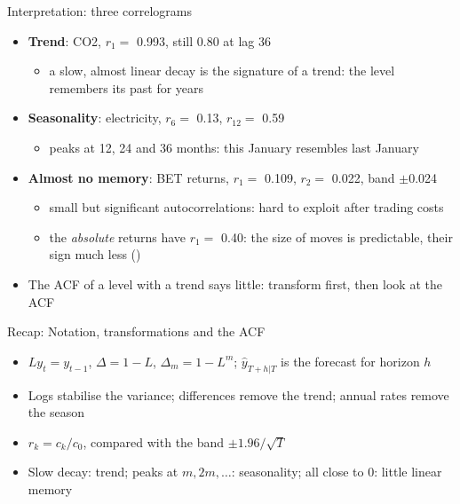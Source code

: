 \begin{frame}{Interpretation: three correlograms}
\itemsize{\small}
\begin{itemize}
    \item \textbf{Trend}: CO2, $r_1 = $ 0.993, still 0.80 at lag 36
    \begin{itemize}
        \item a slow, almost linear decay is the signature of a trend: the level remembers its past for years
    \end{itemize}
    \item \textbf{Seasonality}: electricity, $r_6 = $ 0.13, $r_{12} = $ 0.59
    \begin{itemize}
        \item peaks at 12, 24 and 36 months: this January resembles last January
    \end{itemize}
    \item \textbf{Almost no memory}: BET returns, $r_1 = $ 0.109, $r_2 = $ 0.022, band $\pm$0.024
    \begin{itemize}
        \item small but significant autocorrelations: hard to exploit after trading costs
        \item the \emph{absolute} returns have $r_1 = $ 0.40: the size of moves is predictable, their sign much less ()
    \end{itemize}
    \item The ACF of a level with a trend says little: transform first, then look at the ACF
\end{itemize}
\end{frame}

\begin{frame}{Recap: Notation, transformations and the ACF}
\itemsize{\small}
\begin{itemize}
    \item $L y_t = y_{t-1}$, $\Delta = 1 - L$, $\Delta_m = 1 - L^m$; $\hat y_{T+h|T}$ is the forecast for horizon $h$
    \item Logs stabilise the variance; differences remove the trend; annual rates remove the season
    \item $r_k = c_k / c_0$, compared with the band $\pm 1.96/\sqrt T$
    \item Slow decay: trend; peaks at $m, 2m, \ldots$: seasonality; all close to 0: little linear memory
\end{itemize}
\end{frame}


